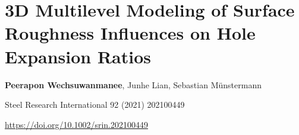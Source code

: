 \chapter[het]{3D Multilevel Modeling of Surface Roughness Influences on Hole Expansion Ratios}\label{ch:het}
\begin{center}

    \textbf{Peerapon Wechsuwanmanee}, Junhe Lian, Sebastian Münstermann
    
    \vspace{20pt}
    
    Steel Research International 92 (2021) 202100449
    
    \vspace{20pt}
    
    \url{https://doi.org/10.1002/srin.202100449}
    
    \vspace{40pt}
    
\end{center}